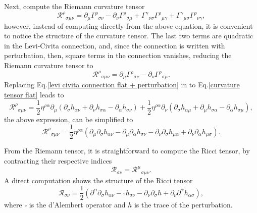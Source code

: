 \documentclass{article}
\begin{document}
Next, compute the Riemann curvature tensor
\begin{equation}
    \label{riemann curvature tensor}
    \mathcal{R}^{\rho}{}_{\sigma\mu\nu} = \partial_{\mu}\Gamma^{\rho}{}_{\sigma\nu}
    - \partial_{\nu}\Gamma^{\rho}{}_{\sigma\mu} 
    + \Gamma^{\gamma}{}_{\nu\sigma}\Gamma^{\rho}{}_{\mu\gamma}
    + \Gamma^{\gamma}{}_{\mu\sigma}\Gamma^{\rho}{}_{\nu\gamma},
\end{equation}
however, instead of computing directly from the above equation, it is convenient to 
notice the structure of the curvature tensor. The last two terms are quadratic in the 
Levi-Civita connection, and, since the connection is written with perturbation, then,
square terms in the connection vanishes, reducing the Riemann curvature tensor to
\begin{equation}
    \label{curvature tensor flat}
    \mathcal{R}^{\rho}{}_{\sigma\mu\nu} = \partial_{\mu}\Gamma^{\rho}{}_{\sigma\nu}
    - \partial_{\nu}\Gamma^{\rho}{}_{\sigma\mu}.
\end{equation}
Replacing Eq.\eqref{levi civita connection flat + perturbation} in to 
Eq.\eqref{curvature tensor flat} leads to
\begin{equation}
    \mathcal{R}^{\rho}{}_{\sigma\mu\nu} = \frac{1}{2}\eta^{\rho \alpha}\partial_{\mu}\left(
        \partial_{\sigma}h_{\alpha\nu} + \partial_{\nu}h_{\sigma\alpha}
        - \partial_{\alpha}h_{\sigma\nu}\right) +
        \frac{1}{2}\eta^{\rho \alpha}\partial_{\nu}\left(
        \partial_{\sigma}h_{\alpha\mu} + \partial_{\mu}h_{\sigma\alpha}
        - \partial_{\alpha}h_{\sigma\mu}\right),
\end{equation}
the above expression, can be simplified to
\begin{equation}
    \mathcal{R}^{\rho}{}_{\sigma\mu\nu} = \frac{1}{2}\eta^{\rho\alpha}\left(
        \partial_{\mu}\partial_{\sigma}h_{\alpha\nu} 
        - \partial_{\mu}\partial_{\alpha}h_{\sigma\nu}
        - \partial_{\nu}\partial_{\sigma}h_{\mu\alpha}
        + \partial_{\nu}\partial_{\alpha}h_{\mu\sigma}\right).
\end{equation}

From the Riemann tensor, it is straightforward to compute the Ricci tensor, by
contracting their respective indices
\begin{equation}
    \mathcal{R}_{\sigma\nu} = \mathcal{R}^{\mu}{}_{\sigma\mu\nu}.
\end{equation}
A direct computation shows the structure of the Ricci tensor
\begin{equation}
    \label{ricci tensor flat + perturbation}
    \mathcal{R}_{\sigma\nu} = \frac{1}{2}\left(
        \partial^{\alpha}\partial_{\sigma}h_{\alpha\nu} 
        -  \square h_{\sigma\nu} - \partial_{\nu}\partial_{\sigma}h
        + \partial_{\nu}\partial^{\alpha}h_{\alpha\sigma}\right),
\end{equation}
where $\square$ is the d'Alembert operator and $h$ is the trace of the perturbation.
\end{document}

